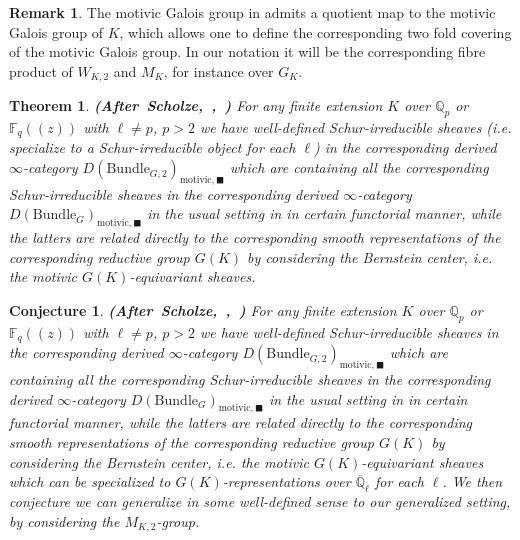 \documentclass[12pt]{book}
\newtheorem{conjecture}{Conjecture}
\newtheorem{theorem}{Theorem}
\theoremstyle{definition}
\newtheorem{remark}{Remark}
\begin{document}
\begin{remark}
The motivic Galois group in \cite{Scho1} admits a quotient map to the motivic Galois group of $K$, which allows one to define the corresponding two fold covering of the motivic Galois group. In our notation it will be the corresponding fibre product of $W_{K,2}$ and $M_K$, for instance over $G_{K}$. 
\end{remark}




\begin{theorem} \mbox{\textbf{(After Scholze, \cite{Scho1}, \cite{Scho2})}}
For any finite extension $K$ over $\mathbb{Q}_p$ or $\mathbb{F}_q((z))$ with $\ell\neq p$, $p>2$ we have well-defined Schur-irreducible sheaves (i.e. specialize to a Schur-irreducible object for each $\ell$) in the corresponding derived $\infty$-category $D(\mathrm{Bundle}_{G,2})_{\text{motivic},\blacksquare}$ which are containing all the corresponding Schur-irreducible sheaves in the corresponding derived $\infty$-category $D(\mathrm{Bundle}_{G})_{\text{motivic},\blacksquare}$ in the usual setting in \cite{Scho1} in certain functorial manner, while the latters are related directly to the corresponding smooth representations of the corresponding reductive group $G(K)$ by considering the Bernstein center, i.e. the motivic $G(K)$-equivariant sheaves.  
\end{theorem}


\begin{conjecture} \mbox{\textbf{(After Scholze, \cite{Scho1}, \cite{Scho2})}}
 For any finite extension $K$ over $\mathbb{Q}_p$ or $\mathbb{F}_q((z))$ with $\ell\neq p$, $p>2$ we have well-defined Schur-irreducible sheaves in the corresponding derived $\infty$-category $D(\mathrm{Bundle}_{G,2})_{\text{motivic},\blacksquare}$ which are containing all the corresponding Schur-irreducible sheaves in the corresponding derived $\infty$-category $D(\mathrm{Bundle}_{G})_{\text{motivic},\blacksquare}$ in the usual setting in \cite{Scho1} in certain functorial manner, while the latters are related directly to the corresponding smooth representations of the corresponding reductive group $G(K)$ by considering the Bernstein center, i.e. the motivic $G(K)$-equivariant sheaves which can be specialized to $G(K)$-representations over $\overline{\mathbb{Q}}_\ell$ for each $\ell$. We then conjecture we can generalize \cite{Scho1} in some well-defined sense to our generalized setting, by considering the $M_{K,2}$-group. 
 \end{conjecture}
\end{document}
